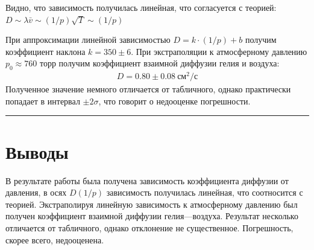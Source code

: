 \documentclass[a4paper,12pt]{report}
\begin{document}
    \begin{figure}[H]
        \centering
    \end{figure}
    \begin{multicols}{2}
    Видно, что зависимость получилась линейная, что согласуется с теорией: $D\sim \lambda \bar{v}\sim (1/p)\sqrt{T}\sim (1/p)$

    При аппроксимации линейной зависимостью $D=k\cdot(1/p)+b$ получим коэффициент наклона $k=350\pm 6$. При экстраполяции к атмосферному давлению $p_0\approx 760$ торр получим коэффициент взаимной диффузии гелия и воздуха:
    \begin{gather*}
        D=0.80\pm 0.08 \ \text{см}^2/\text{с}
    \end{gather*}
    Полученное значение немного отличается от табличного, однако практически попадает в интервал $\pm 2\sigma$, что говорит о недооценке погрешности.
    \end{multicols}
    \hrule
    \section{Выводы}
    \begin{multicols}{2}
        В результате работы была получена зависимость коэффициента диффузии от давления, в осях $D(1/p)$ зависимость получилась линейная, что соотносится с теорией. Экстраполируя линейную зависимость к атмосферному давлению был получен коэффициент взаимной диффузии гелия---воздуха. Результат несколько отличается от табличного, однако отклонение не существенное. Погрешность, скорее всего, недооценена.
    \end{multicols}
\end{document}
